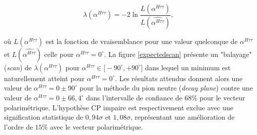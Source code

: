 \begin{equation}
    \lambda(\alpha^{H\tau\tau})=-2\ln\frac{L(\alpha^{H\tau\tau})}{L(\widehat{\alpha^{H\tau\tau}})},
\end{equation}

où $L(\alpha^{H\tau\tau})$ est la fonction de vraisemblance pour une valeur quelconque de $\alpha^{H\tau\tau}$ et $L(\widehat{\alpha^{H\tau\tau}})$ celle pour $\alpha^{H\tau\tau}=0^{\circ}$. La figure \ref{expectedscan} présente un "balayage" (\textit{scan}) de $\lambda(\alpha^{H\tau\tau})$ pour $\alpha^{H\tau\tau}\in\bigl[-90^{\circ},+90^{\circ}\bigr]$ dans lequel un minimum est naturellement atteint pour $\alpha^{H\tau\tau}=0^{\circ}$. Les résultats attendus donnent alors une valeur de $\alpha^{H\tau\tau}=0\pm90^{\circ}$ pour la méthode du pion neutre (\textit{decay plane}) contre une valeur de $\alpha^{H\tau\tau}=0\pm66,4^{\circ}$ dans l'intervalle de confiance de $68\%$ pour le vecteur polarimétrique. L'hypothèse CP impaire est respectivement exclue avec une signification statistique de $0,94\sigma$ et $1,08\sigma$, représentant une amélioration de l'ordre de $15\%$ avec le vecteur polarimétrique. \\

